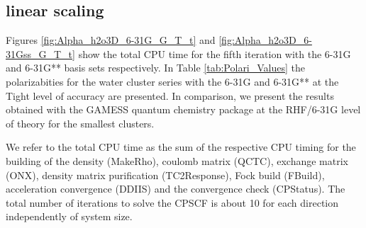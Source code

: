 \documentclass[twocolumn,showpacs,preprintnumbers,amsmath,amssymb]{revtex4}
\begin{document}
\subsection{linear scaling}
 Figures \ref{fig:Alpha_h2o3D_6-31G_G_T_t} and 
 \ref{fig:Alpha_h2o3D_6-31Gss_G_T_t} show the
 total CPU time for the fifth 
 iteration with the 6-31G and 6-31G** basis sets respectively.
 In Table \ref{tab:Polari_Values} the
 polarizabities for the water cluster series
 with the 6-31G and 6-31G** at the Tight level
 of accuracy are presented. In comparison, 
 we present the results obtained with the GAMESS
 quantum chemistry package \cite{gamess}
 at the RHF/6-31G level of theory for the smallest clusters.

 We refer to the total CPU time as the
 sum of the respective CPU timing for the building 
 of the density (MakeRho), coulomb matrix (QCTC), 
 exchange matrix (ONX), density matrix purification 
 (TC2Response), Fock build (FBuild), acceleration convergence
 (DDIIS) and the convergence check (CPStatus).
 The total number of iterations to solve the CPSCF is about 10
 for each direction independently of system size.
\end{document}
